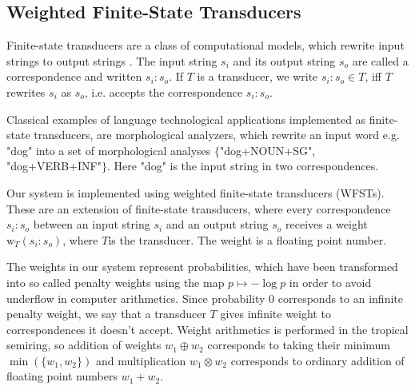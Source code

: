 \documentclass[a4paper,conference]{IEEEtran}
\begin{document}
\subsection{Weighted Finite-State Transducers}


Finite-state transducers are a class of computational models, which
rewrite input strings to output strings \cite{beesley/2003}. The input
string $s_i$ and its output string $s_o$ are called a correspondence
and written $s_i\mathrm{:}s_o$. If $T$ is a transducer, we write
$s_i\mathrm{:}s_o \in T$, iff $T$ rewrites $s_i$ as $s_o$, i.e. accepts the correspondence $s_i\mathrm{:}s_o$.

Classical examples of language technological applications
implemented as finite-state transducers, are morphological analyzers,
which rewrite an input word e.g. "dog" into a set of morphological
analyses $\{$"dog+NOUN+SG", "dog+VERB+INF"$\}$. Here "dog" is the
input string in two correspondences.

Our system is implemented using weighted finite-state transducers
(WFSTs). These are an extension of finite-state transducers, where
every correspondence $s_i\mathrm{:}s_o$ between an input string $s_i$
and an output string $s_o$ receives a weight $\mathrm{w}_T(s_i\mathrm{:}s_o)$,
where $T$is the transducer. The weight is a floating point number. 

The weights in our system represent probabilities, which have been
transformed into so called penalty weights using the map $p \mapsto
-\log p$ in order to avoid underflow in computer arithmetics. Since
probability $0$ corresponds to an infinite penalty weight, we say that
a transducer $T$ gives infinite weight to correspondences it doesn't
accept. Weight arithmetics is performed in the tropical semiring, so
addition of weights $w_1 \oplus w_2$ corresponds to taking their
minimum $\min(\{w_1,w_2\})$ and multiplication $w_1 \otimes w_2$
corresponds to ordinary addition of floating point numbers $w_1 + w_2$.
\end{document}
